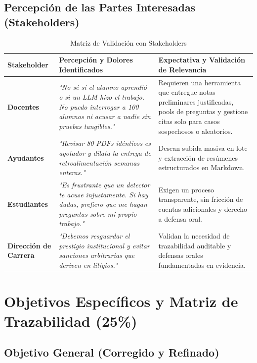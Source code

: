 \documentclass[11pt,a4paper]{article}
\begin{document}
\subsection{Percepción de las Partes Interesadas (Stakeholders)}

\begin{table}[h!]
\centering
\small
\begin{tabularx}{\textwidth}{l p{5.5cm} X}
\toprule
\textbf{Stakeholder} & \textbf{Percepción y Dolores Identificados} & \textbf{Expectativa y Validación de Relevancia} \\
\midrule
\textbf{Docentes} & 
\textit{"No sé si el alumno aprendió o si un LLM hizo el trabajo. No puedo interrogar a 100 alumnos ni acusar a nadie sin pruebas tangibles."} & 
Requieren una herramienta que entregue notas preliminares justificadas, pools de preguntas y gestione citas solo para casos sospechosos o aleatorios. \\
\addlinespace
\textbf{Ayudantes} & 
\textit{"Revisar 80 PDFs idénticos es agotador y dilata la entrega de retroalimentación semanas enteras."} & 
Desean subida masiva en lote y extracción de resúmenes estructurados en Markdown. \\
\addlinespace
\textbf{Estudiantes} & 
\textit{"Es frustrante que un detector te acuse injustamente. Si hay dudas, prefiero que me hagan preguntas sobre mi propio trabajo."} & 
Exigen un proceso transparente, sin fricción de cuentas adicionales y derecho a defensa oral. \\
\addlinespace
\textbf{Dirección de Carrera} & 
\textit{"Debemos resguardar el prestigio institucional y evitar sanciones arbitrarias que deriven en litigios."} & 
Validan la necesidad de trazabilidad auditable y defensas orales fundamentadas en evidencia. \\
\bottomrule
\end{tabularx}
\caption{Matriz de Validación con Stakeholders}
\end{table}

\newpage

\section{Objetivos Específicos y Matriz de Trazabilidad (25\%)}

\subsection{Objetivo General (Corregido y Refinado)}
\end{document}
